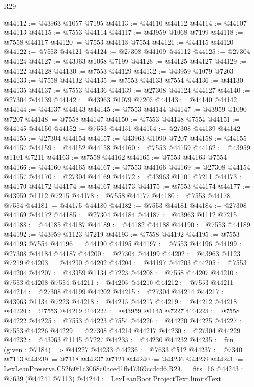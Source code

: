 \begin{lexlean}{R29}
\begin{coremodule}
@44112 := @43963 @1057 @7195
@44113 := @44110 @44112
@44114 := @44107 @44113
@44115 := @7553 @44114
@44117 := @43959 @1068 @7199
@44118 := @7558 @44117
@44120 := @7553 @44118 @7554
@44121 := @44115 @44120
@44122 := @7553 @44121
@44124 := @27308 @44109 @44112
@44125 := @27304 @44124
@44127 := @43963 @1068 @7199
@44128 := @44125 @44127
@44129 := @44122 @44128
@44130 := @7553 @44129
@44132 := @43959 @1079 @7203
@44133 := @7558 @44132
@44135 := @7553 @44133 @7554
@44136 := @44130 @44135
@44137 := @7553 @44136
@44139 := @27308 @44124 @44127
@44140 := @27304 @44139
@44142 := @43963 @1079 @7203
@44143 := @44140 @44142
@44144 := @44137 @44143
@44145 := @7553 @44144
@44147 := @43959 @1090 @7207
@44148 := @7558 @44147
@44150 := @7553 @44148 @7554
@44151 := @44145 @44150
@44152 := @7553 @44151
@44154 := @27308 @44139 @44142
@44155 := @27304 @44154
@44157 := @43963 @1090 @7207
@44158 := @44155 @44157
@44159 := @44152 @44158
@44160 := @7553 @44159
@44162 := @43959 @1101 @7211
@44163 := @7558 @44162
@44165 := @7553 @44163 @7554
@44166 := @44160 @44165
@44167 := @7553 @44166
@44169 := @27308 @44154 @44157
@44170 := @27304 @44169
@44172 := @43963 @1101 @7211
@44173 := @44170 @44172
@44174 := @44167 @44173
@44175 := @7553 @44174
@44177 := @43959 @1112 @7215
@44178 := @7558 @44177
@44180 := @7553 @44178 @7554
@44181 := @44175 @44180
@44182 := @7553 @44181
@44184 := @27308 @44169 @44172
@44185 := @27304 @44184
@44187 := @43963 @1112 @7215
@44188 := @44185 @44187
@44189 := @44182 @44188
@44190 := @7553 @44189
@44192 := @43959 @1123 @7219
@44193 := @7558 @44192
@44195 := @7553 @44193 @7554
@44196 := @44190 @44195
@44197 := @7553 @44196
@44199 := @27308 @44184 @44187
@44200 := @27304 @44199
@44202 := @43963 @1123 @7219
@44203 := @44200 @44202
@44204 := @44197 @44203
@44205 := @7553 @44204
@44207 := @43959 @1134 @7223
@44208 := @7558 @44207
@44210 := @7553 @44208 @7554
@44211 := @44205 @44210
@44212 := @7553 @44211
@44214 := @27308 @44199 @44202
@44215 := @27304 @44214
@44217 := @43963 @1134 @7223
@44218 := @44215 @44217
@44219 := @44212 @44218
@44220 := @7553 @44219
@44222 := @43959 @1145 @7227
@44223 := @7558 @44222
@44225 := @7553 @44223 @7554
@44226 := @44220 @44225
@44227 := @7553 @44226
@44229 := @27308 @44214 @44217
@44230 := @27304 @44229
@44232 := @43963 @1145 @7227
@44233 := @44230 @44232
@44235 := fun (given : @7184) => @44227 @44233
@44236 := @7633 @512
@44237 := @7340 @7113
@44239 := @7118 @44237 @7121
@44240 := @44236 @44239
@44241 := LexLeanPreserve.C52fc0f1c3068d0aced1fb47369ccdcd6.R29.__fits_16
@44243 := @7639 (@44241 @7113)
@44244 := LexLeanBoot.ProjectText.limitsText

\end{coremodule}
\end{lexlean}
